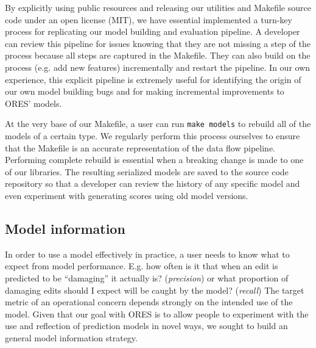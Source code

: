 By explicitly using public resources and releasing our utilities and Makefile source code under an open license (MIT), we have essential implemented a turn-key process for replicating our model building and evaluation pipeline.  A developer can review this pipeline for issues knowing that they are not missing a step of the process because all steps are captured in the Makefile.  They can also build on the process (e.g. add new features) incrementally and restart the pipeline.  In our own experience, this explicit pipeline is extremely useful for identifying the origin of our own model building bugs and for making incremental improvements to ORES' models.

At the very base of our Makefile, a user can run \texttt{make models} to rebuild all of the models of a certain type.  We regularly perform this process ourselves to ensure that the Makefile is an accurate representation of the data flow pipeline.  Performing complete rebuild is essential when a breaking change is made to one of our libraries.  The resulting serialized models are saved to the source code repository so that a developer can review the history of any specific model and even experiment with generating scores using old model versions.

\subsection{Model information}
In order to use a model effectively in practice, a user needs to know what to expect from model performance.  E.g. how often is it that when an edit is predicted to be ``damaging'' it actually is? (\emph{precision}) or what proportion of damaging edits should I expect will be caught by the model? (\emph{recall})  The target metric of an operational concern depends strongly on the intended use of the model.  Given that our goal with ORES is to allow people to experiment with the use and reflection of prediction models in novel ways, we sought to build an general model information strategy.

